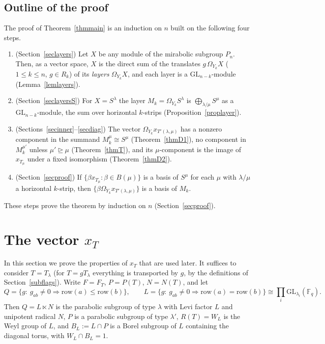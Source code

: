 \documentclass[11pt, letterpaper]{amsart}
\theoremstyle{definition}
\theoremstyle{remark}
\newcommand{\FF}{\mathbb{F}}
\newcommand{\GL}{\mathrm{GL}}
\newcommand{\row}{\mathrm{row}}
\begin{document}
\subsection{Outline of the proof}

The proof of Theorem~\ref{thmmain} is an induction on $n$ built on the following four steps.
\begin{enumerate}
\item (Section~\ref{seclayers}) Let $X$ be any module of the mirabolic subgroup $P_n$. Then, as a vector space, $X$ is the direct sum of the translates $g\,\Omega_{Y_k}X$ ($1\le k\le n$, $g\in R_k$) of its \emph{layers} $\Omega_{Y_k}X$, and each layer is a $\GL_{n-k}$-module (Lemma~\ref{lemlayers}).
\item (Section~\ref{seclayersS}) For $X=S^\lambda$ the layer $M_k=\Omega_{Y_k}S^\lambda$ is $\bigoplus_{\lambda/\mu}S^\mu$ as a $\GL_{n-k}$-module, the sum over horizontal $k$-strips (Proposition~\ref{proplayer}).
\item (Sections~\ref{secinner}--\ref{secdiag}) The vector $\Omega_{Y_k}x_{T'(\lambda,\mu)}$ has a nonzero component in the summand $M^\mu_k\cong S^\mu$ (Theorem~\ref{thmD1}), no component in $M^{\mu'}_k$ unless $\mu'\trianglerighteq\mu$ (Theorem~\ref{thmT}), and its $\mu$-component is the image of $x_{T_\mu}$ under a fixed isomorphism (Theorem~\ref{thmD2}).
\item (Section~\ref{secproof}) If $\{\beta x_{T_\mu}:\beta\in B(\mu)\}$ is a basis of $S^\mu$ for each $\mu$ with $\lambda/\mu$ a horizontal $k$-strip, then $\{\beta \Omega_{Y_k}x_{T'(\lambda,\mu)}\}$ is a basis of $M_k$.
\end{enumerate}
These steps prove the theorem by induction on $n$ (Section~\ref{secproof}).

\section{The vector \texorpdfstring{$x_T$}{xT}}\label{secx}

In this section we prove the properties of $x_T$ that are used later. It suffices to consider $T=T_\lambda$ (for $T=gT_\lambda$ everything is transported by $g$, by the definitions of Section~\ref{subflags}). Write $F=F_T$, $P=P(T)$, $N=N(T)$, and let
\[
Q=\{g:\ g_{ab}\ne0\Rightarrow\row(a)\le\row(b)\},\qquad L=\{g:\ g_{ab}\ne0\Rightarrow\row(a)=\row(b)\}\cong\prod_i\GL_{\lambda_i}(\FF_q).
\]
Then $Q=L\ltimes N$ is the parabolic subgroup of type $\lambda$ with Levi factor $L$ and unipotent radical $N$, $P$ is a parabolic subgroup of type $\lambda'$, $R(T)=W_L$ is the Weyl group of $L$, and $B_L:=L\cap P$ is a Borel subgroup of $L$ containing the diagonal torus, with $W_L\cap B_L=1$.
\end{document}

